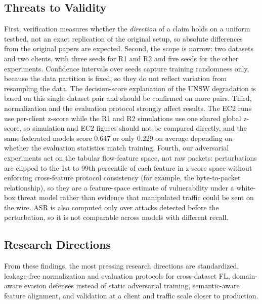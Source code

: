 \documentclass[conference]{IEEEtran}
\begin{document}
\subsection{Threats to Validity}
First, verification measures whether the \emph{direction} of a claim holds on a uniform
testbed, not an exact replication of the original setup, so absolute differences from the
original papers are expected. Second, the scope is narrow: two datasets and two clients, with
three seeds for R1 and R2 and five seeds for the other experiments. Confidence intervals over
seeds capture training randomness only, because the data partition is fixed, so they do not
reflect variation from resampling the data. The decision-score explanation of the UNSW degradation is
based on this single dataset pair and should be confirmed on more pairs. Third, normalization and the
evaluation protocol strongly affect results. The EC2 runs use per-client z-score while the R1
and R2 simulations use one shared global z-score, so simulation and EC2 figures should not be
compared directly, and the same federated models score 0.647 or only 0.229 on average depending
on whether the evaluation statistics match training. Fourth, our adversarial experiments act on
the tabular flow-feature space, not raw packets: perturbations are clipped to the 1st to 99th
percentile of each feature in z-score space without enforcing cross-feature protocol consistency
(for example, the byte-to-packet relationship), so they are a feature-space estimate of
vulnerability under a white-box threat model rather than evidence that manipulated traffic could
be sent on the wire. ASR is also computed only over attacks detected before the perturbation, so
it is not comparable across models with different recall.

\subsection{Research Directions}
From these findings, the most pressing research directions are standardized, leakage-free
normalization and evaluation protocols for cross-dataset FL, domain-aware evasion defenses
instead of static adversarial training, semantic-aware feature alignment, and validation
at a client and traffic scale closer to production.
\end{document}

